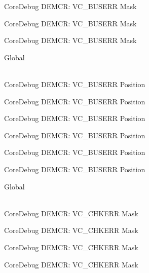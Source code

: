 \begin{DoxyRefList}
\label{deprecated__deprecated000422}%
%
Core\+Debug DEMCR\+: VC\+\_\+\+BUSERR Mask 

\label{deprecated__deprecated000511}%
%
Core\+Debug DEMCR\+: VC\+\_\+\+BUSERR Mask 

\label{deprecated__deprecated000613}%
%
Core\+Debug DEMCR\+: VC\+\_\+\+BUSERR Mask  
\item[{\parbox[t]{\linewidth}{Global \doxylink{group___c_m_s_i_s___core_debug_gab8e3d8f0f9590a51bbf10f6da3ad6933}{Core\+Debug\+\_\+\+DEMCR\+\_\+\+VC\+\_\+\+BUSERR\+\_\+\+Pos} }}]\hfill \\
\label{deprecated__deprecated000059}%
%
Core\+Debug DEMCR\+: VC\+\_\+\+BUSERR Position 

\label{deprecated__deprecated000203}%
%
Core\+Debug DEMCR\+: VC\+\_\+\+BUSERR Position 

\label{deprecated__deprecated000345}%
%
Core\+Debug DEMCR\+: VC\+\_\+\+BUSERR Position 

\label{deprecated__deprecated000421}%
%
Core\+Debug DEMCR\+: VC\+\_\+\+BUSERR Position 

\label{deprecated__deprecated000510}%
%
Core\+Debug DEMCR\+: VC\+\_\+\+BUSERR Position 

\label{deprecated__deprecated000612}%
%
Core\+Debug DEMCR\+: VC\+\_\+\+BUSERR Position  
\item[{\parbox[t]{\linewidth}{Global \doxylink{group___c_m_s_i_s___core_debug_ga2f98b461d19746ab2febfddebb73da6f}{Core\+Debug\+\_\+\+DEMCR\+\_\+\+VC\+\_\+\+CHKERR\+\_\+\+Msk} }}]\hfill \\
\label{deprecated__deprecated000064}%
%
Core\+Debug DEMCR\+: VC\+\_\+\+CHKERR Mask 

\label{deprecated__deprecated000208}%
%
Core\+Debug DEMCR\+: VC\+\_\+\+CHKERR Mask 

\label{deprecated__deprecated000350}%
%
Core\+Debug DEMCR\+: VC\+\_\+\+CHKERR Mask 

\label{deprecated__deprecated000426}%
%
Core\+Debug DEMCR\+: VC\+\_\+\+CHKERR Mask 


\end{DoxyRefList}
